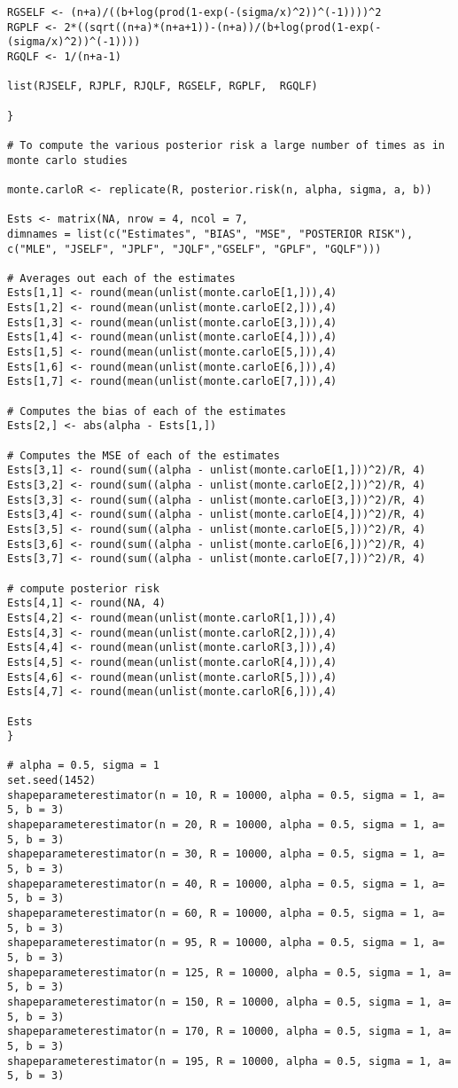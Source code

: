 \documentclass[a4paper,12pt]{report}
\begin{document}
{\begin{verbatim}
RGSELF <- (n+a)/((b+log(prod(1-exp(-(sigma/x)^2))^(-1))))^2
RGPLF <- 2*((sqrt((n+a)*(n+a+1))-(n+a))/(b+log(prod(1-exp(-(sigma/x)^2))^(-1))))
RGQLF <- 1/(n+a-1)

list(RJSELF, RJPLF, RJQLF, RGSELF, RGPLF,  RGQLF)

}

# To compute the various posterior risk a large number of times as in monte carlo studies

monte.carloR <- replicate(R, posterior.risk(n, alpha, sigma, a, b))

Ests <- matrix(NA, nrow = 4, ncol = 7, 
dimnames = list(c("Estimates", "BIAS", "MSE", "POSTERIOR RISK"),
c("MLE", "JSELF", "JPLF", "JQLF","GSELF", "GPLF", "GQLF")))

# Averages out each of the estimates
Ests[1,1] <- round(mean(unlist(monte.carloE[1,])),4)
Ests[1,2] <- round(mean(unlist(monte.carloE[2,])),4)
Ests[1,3] <- round(mean(unlist(monte.carloE[3,])),4)
Ests[1,4] <- round(mean(unlist(monte.carloE[4,])),4)
Ests[1,5] <- round(mean(unlist(monte.carloE[5,])),4)
Ests[1,6] <- round(mean(unlist(monte.carloE[6,])),4)
Ests[1,7] <- round(mean(unlist(monte.carloE[7,])),4)

# Computes the bias of each of the estimates
Ests[2,] <- abs(alpha - Ests[1,])

# Computes the MSE of each of the estimates
Ests[3,1] <- round(sum((alpha - unlist(monte.carloE[1,]))^2)/R, 4)
Ests[3,2] <- round(sum((alpha - unlist(monte.carloE[2,]))^2)/R, 4)
Ests[3,3] <- round(sum((alpha - unlist(monte.carloE[3,]))^2)/R, 4)
Ests[3,4] <- round(sum((alpha - unlist(monte.carloE[4,]))^2)/R, 4)
Ests[3,5] <- round(sum((alpha - unlist(monte.carloE[5,]))^2)/R, 4)
Ests[3,6] <- round(sum((alpha - unlist(monte.carloE[6,]))^2)/R, 4)
Ests[3,7] <- round(sum((alpha - unlist(monte.carloE[7,]))^2)/R, 4)

# compute posterior risk
Ests[4,1] <- round(NA, 4)
Ests[4,2] <- round(mean(unlist(monte.carloR[1,])),4)
Ests[4,3] <- round(mean(unlist(monte.carloR[2,])),4)
Ests[4,4] <- round(mean(unlist(monte.carloR[3,])),4)
Ests[4,5] <- round(mean(unlist(monte.carloR[4,])),4)
Ests[4,6] <- round(mean(unlist(monte.carloR[5,])),4)
Ests[4,7] <- round(mean(unlist(monte.carloR[6,])),4)

Ests
}

# alpha = 0.5, sigma = 1
set.seed(1452)
shapeparameterestimator(n = 10, R = 10000, alpha = 0.5, sigma = 1, a= 5, b = 3)
shapeparameterestimator(n = 20, R = 10000, alpha = 0.5, sigma = 1, a= 5, b = 3)
shapeparameterestimator(n = 30, R = 10000, alpha = 0.5, sigma = 1, a= 5, b = 3)
shapeparameterestimator(n = 40, R = 10000, alpha = 0.5, sigma = 1, a= 5, b = 3)
shapeparameterestimator(n = 60, R = 10000, alpha = 0.5, sigma = 1, a= 5, b = 3)
shapeparameterestimator(n = 95, R = 10000, alpha = 0.5, sigma = 1, a= 5, b = 3)
shapeparameterestimator(n = 125, R = 10000, alpha = 0.5, sigma = 1, a= 5, b = 3)
shapeparameterestimator(n = 150, R = 10000, alpha = 0.5, sigma = 1, a= 5, b = 3)
shapeparameterestimator(n = 170, R = 10000, alpha = 0.5, sigma = 1, a= 5, b = 3)
shapeparameterestimator(n = 195, R = 10000, alpha = 0.5, sigma = 1, a= 5, b = 3)


\end{verbatim}}
\end{document}
